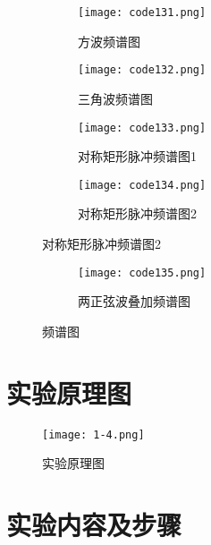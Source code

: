 \begin{figure}[htpb]
	\centering
	\begin{subfigure}[htpb]{.45\linewidth}
		\centering
		\texttt{[image: code131.png]}
		\caption{方波频谱图}
		\label{fig:方波频谱图}
	\end{subfigure}
	\quad
	\begin{subfigure}[htpb]{.45\linewidth}
		\centering
		\texttt{[image: code132.png]}
		\caption{三角波频谱图}
		\label{fig:三角波频谱图}
	\end{subfigure}

	\begin{subfigure}[htpb]{.45\linewidth}
		\centering
		\texttt{[image: code133.png]}
		\caption{对称矩形脉冲频谱图1}
		\label{fig:对称矩形脉冲频谱图1}
	\end{subfigure}
	\quad
	\begin{subfigure}[htpb]{.45\linewidth}
		\centering
		\texttt{[image: code134.png]}
		\caption{对称矩形脉冲频谱图2}
		\label{fig:对称矩形脉冲频谱图2}
	\end{subfigure}
\end{figure}

\addtocounter{figure}{-1}
\begin{figure}[htpb]
	\centering
	\setcounter{sub}{\value{subfigure}}
	\begin{subfigure}[htpb]{.45\linewidth}
		\setcounter{subfigure}{\value{sub}}
		\centering
		\texttt{[image: code135.png]}
		\caption{两正弦波叠加频谱图}
		\label{fig:两正弦波叠加频谱图}
	\end{subfigure}
	\caption{频谱图}
	\label{fig:频谱图}
\end{figure}

\newpage

\section{实验原理图}%
\label{sec:实验原理图\arabic{chapter}}

\begin{figure}[htpb]
	\centering
	\texttt{[image: 1-4.png]}
	\caption{实验原理图}
	\label{fig:实验原理图\arabic{chapter}}
\end{figure}

\section{实验内容及步骤}%
\label{sec:实验内容及步骤\arabic{chapter}}

